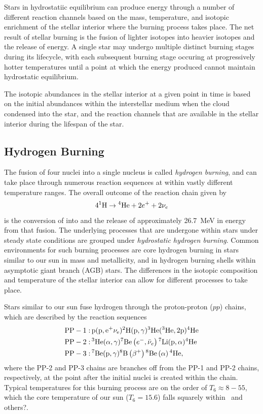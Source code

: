 Stars in hydrostatiic equilibrium can produce energy through a number of
different reaction channels based on the mass, temperature, and isotopic
enrichment of the stellar interior where the burning process takes place. The
net result of stellar burning is the fusion of lighter isotopes into heavier
isotopes and the release of energy. A single star may undergo multiple distinct
burning stages during its lifecycle, with each subsequent burning stage
occuring at progressively hotter temperatures until a point at which the energy
produced cannot maintain hydrostatic equilibrium.

The isotopic abundances in the stellar interior at a given point in time is
based on the initial abundances within the interstellar medium when the cloud
condensed into the star, and the reaction channels that are available in the
stellar interior during the lifespan of the star.

\subsection{Hydrogen Burning}

The fusion of four  nuclei into a single  nucleus is
called \emph{hydrogen burning}, and can take place through numerous reaction
sequences at within vastly different temperature ranges. The overall outcome
of the reaction chain given by
\[
    4{}^{1}\textrm{H} \rightarrow{} {}^{4}\textrm{He} + 2e^+ + 2\nu_e
\]
is the conversion of  into  and the release of
approximately 26.7~MeV in energy from that fusion. The underlying processes
that are undergone within stars under steady state conditions are grouped under
\emph{hydrostatic hydrogen burning}. Common environments for such burning
processes are core hydrogen burning in stars similar to our sun in mass and
metallicity, and in hydrogen burning shells within asymptotic giant branch
(AGB) stars. The differences in the isotopic composition and temperature of the
stellar interior can allow for different processes to take place.

Stars similar to our sun fuse hydrogen through the proton-proton ($pp$) chains,
which are described by the reaction sequences
\begin{align*}
    \rm{PP-1:\,}& \rm{p}(\rm{p},e^+\nu_e)
        {}^{2}\textrm{H}(\rm{p},\gamma)
        {}^{3}\textrm{He}({}^{3}\textrm{He},2\rm{p}){}^{4}\textrm{He} \\
    \rm{PP-2:\,}& {}^{3}\textrm{He}(\alpha,\gamma){}^{7}\textrm{Be}
        \left(e^-,\bar{\nu}_e\right){}^{7}\textrm{Li}(\rm{p},\alpha){}^{4}\textrm{He} \\
    \rm{PP-3:\,}& {}^{7}\textrm{Be}(\rm{p},\gamma){}^{8}\textrm{B}
        \left(\beta^+\right){}^{8}\textrm{Be}\left(\alpha\right){}^{4}\textrm{He},
\end{align*}
where the PP-2 and PP-3 chains are branches off from the PP-1 and PP-2 chains,
respectively, at the point after the initial nuclei is created within the
chain. Typical temperatures for this burning process are on the order of
$T_6 \approx 8-55$, which the core temperature of our sun ($T_6 = 15.6$) falls
squarely within~\cite{Iliadis} and others?.

